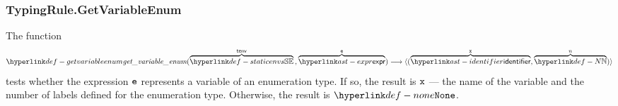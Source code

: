 \begin{mathpar}
\end{mathpar}

\subsubsection{TypingRule.GetVariableEnum\label{sec:TypingRule.GetVariableEnum}}
\hypertarget{def-getvariableenum}{}
The function
\[
\getvariableenum(\overname{\staticenvs}{\tenv} \aslsep \overname{\expr}{\ve}) \aslto
\langle (\overname{\identifier}{\vx}, \overname{\N}{n})\rangle
\]
tests whether the expression $\ve$ represents a variable of an enumeration type.
If so, the result is $\vx$ --- the name of the variable and the number of labels defined for the enumeration type.
Otherwise, the result is $\None$.

